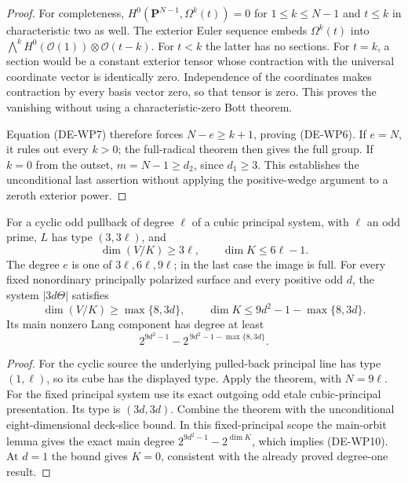 \begin{proof}
For completeness, \(H^0(\mathbf P^{N-1},\Omega^k(t))=0\)
for \(1\le k\le N-1\) and \(t\le k\) in characteristic
two as well. The exterior Euler sequence embeds
\(\Omega^k(t)\) into
\(\bigwedge^k H^0(\mathcal O(1))\otimes\mathcal O(t-k)\).
For \(t<k\) the latter has no sections. For \(t=k\), a
section would be a constant exterior tensor whose contraction
with the universal coordinate vector is identically zero.
Independence of the coordinates makes contraction by every
basis vector zero, so that tensor is zero. This proves the
vanishing without using a characteristic-zero Bott theorem.

Equation (DE-WP7) therefore forces \(N-e\ge k+1\), proving
(DE-WP6). If \(e=N\), it rules out every \(k>0\); the
full-radical theorem then gives the full group. If \(k=0\)
from the outset, \(m=N-1\ge d_2\), since \(d_1\ge3\).
This establishes the unconditional last assertion without
applying the positive-wedge argument to a zeroth exterior power.
\end{proof}

\begin{corollary}
\label{cor:DE-Lang-wedge-cyclic-principal-bounds}
For a cyclic odd pullback of degree \(\ell\) of a cubic principal
system, with \(\ell\) an odd prime, \(L\) has type
\((3,3\ell)\), and
\[
          \dim(V/K)\ge3\ell,\qquad \dim K\le6\ell-1.
 \tag{DE-WP8}
\]
The degree \(e\) is one of \(3\ell,6\ell,9\ell\);
in the last case the image is full.
For every fixed nonordinary principally polarized surface and
every positive odd \(d\), the system \(|3d\Theta|\) satisfies
\[
    \dim(V/K)\ge\max\{8,3d\},\qquad
    \dim K\le9d^2-1-\max\{8,3d\}.
 \tag{DE-WP9}
\]
Its main nonzero Lang component has degree at least
\[
       2^{9d^2-1}-2^{\,9d^2-1-\max\{8,3d\}}.
 \tag{DE-WP10}
\]
\end{corollary}
\begin{proof}
For the cyclic source the underlying pulled-back principal line
has type \((1,\ell)\), so its cube has the displayed type.
Apply the theorem, with \(N=9\ell\).
For the fixed principal system use its exact outgoing odd etale
cubic-principal presentation. Its type is \((3d,3d)\).
Combine the theorem with the unconditional eight-dimensional
deck-slice bound. In this fixed-principal scope the main-orbit
lemma gives the exact main degree \(2^{9d^2-1}-2^{\dim K}\),
which implies (DE-WP10). At \(d=1\) the bound gives \(K=0\),
consistent with the already proved degree-one result.
\end{proof}

